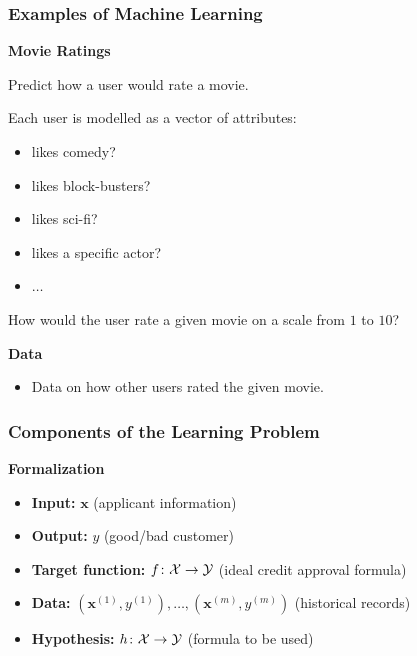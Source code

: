 \documentclass[xcolor=table]{beamer}
\newcommand{\vect}[1]{\ensuremath{\mathbf{#1}}}
\newcommand{\calX}{\ensuremath{{\cal X}}}
\newcommand{\calY}{\ensuremath{{\cal Y}}}
\begin{document}
\begin{frame}[t]
\frametitle{Examples of Machine Learning}
\textcolor{orange2}{\textbf{Movie Ratings}}

Predict how a user would rate a movie.

\pause

\medskip

Each user is modelled as a vector of attributes:
\begin{itemize}
    \item likes comedy?  
    \item likes block-busters?
    \item likes sci-fi?
    \item likes a specific actor?
    \item $\ldots$
\end{itemize}

\pause

How would the user rate a given movie on a scale from $1$ to $10$?

\bigskip

\textbf{Data}
\begin{itemize}
    \item Data on how other users rated the given movie. 
\end{itemize}
\end{frame}


\begin{frame}[t]
\frametitle{Components of the Learning Problem}

\textbf{Formalization}

\begin{itemize}
    \item \textbf{Input:} $\vect{x}$ (applicant information)

    \pause

    \item \textbf{Output:} $y$ (good/bad customer)
    
    \pause

    \item \textbf{Target function:} $f \colon \calX \rightarrow \calY$ (ideal credit
    approval formula)
    
    \pause

    \item \textbf{Data:} $(\vect{x}^{(1)}, y^{(1)}), \ldots, (\vect{x}^{(m)},
    y^{(m)})$ (historical records)
    
    \pause

    \item \textbf{Hypothesis:} $h \colon \calX \rightarrow \calY$ (formula to be used)
\end{itemize} 
\end{frame}
\end{document}
